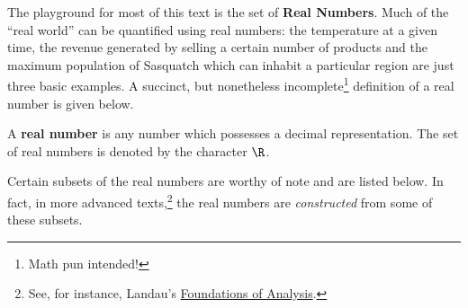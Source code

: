 The playground for most of this text is the set of \textbf{Real Numbers}.  Much of the ``real world'' can be quantified using real numbers: the temperature at a given time, the revenue generated by selling a certain number of products and the maximum population of Sasquatch which can inhabit a particular region are just three basic examples.   A succinct, but nonetheless incomplete\footnote{Math pun intended!} definition of a real number is given below.

\colorbox{ResultColor}{\bbm

\begin{defn} \label{realnumberdefn}

A \textbf{real number} is any number which possesses a decimal representation.  The set of real numbers is denoted by the character $\R$.  

\end{defn}

\ebm}

Certain subsets of the real numbers are worthy of note and are listed below.  In fact, in more advanced texts,\footnote{See, for instance, Landau's \underline{Foundations of Analysis}.}   the real numbers are \textit{constructed} from some of these subsets.  

\label{setsofnumbersboxonthispage}

